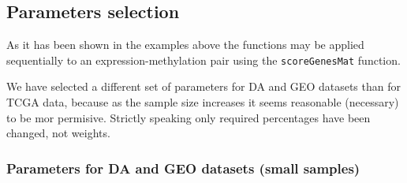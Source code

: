 \documentclass[a4paper,10pt]{article}\usepackage[]{graphicx}\usepackage[]{color}
\begin{document}
\subsection{Parameters selection}

As it has been shown in the examples above the functions 
may be applied sequentially to an expression-methylation pair using the 
\texttt{scoreGenesMat} function.

We have selected a different set of parameters for DA and GEO datasets than for TCGA data, because as the sample size increases it seems reasonable (necessary) to be mor permisive. Strictly speaking only required percentages have been changed, not weights.

\subsubsection{Parameters for DA and GEO datasets (small samples)}
\end{document}
